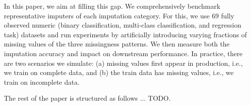 In this paper, we aim at filling this gap. We comprehensively benchmark representative imputers of each imputation category. For this, we use $69$ fully observed numeric (binary classification, multi-class classification, and regression task) datasets and run experiments by artificially introducing varying fractions of missing values of the three missingness patterns. We then measure both the imputation accuracy and impact on downstream performance. In practice, there are two scenarios we simulate: (a) missing values first appear in production, i.e., we train on complete data, and (b) the train data has missing values, i.e., we train on incomplete data.

The rest of the paper is structured as follows ... TODO.
